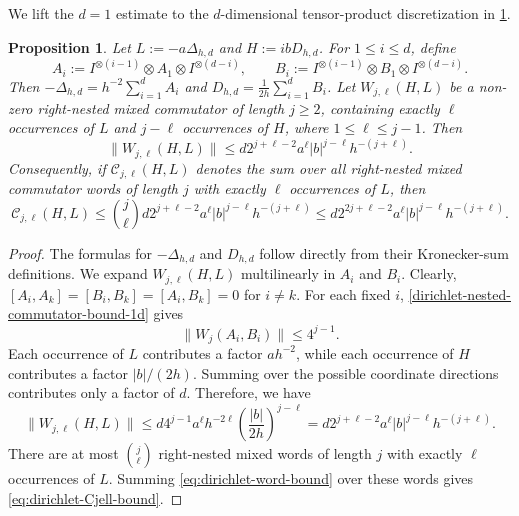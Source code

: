 \documentclass[10pt,reqno]{article}
\numberwithin{equation}{section}
\theoremstyle{plain}
\newtheorem{prop}[thm]{Proposition}
\theoremstyle{definition}
\begin{document}
We lift the $d=1$ estimate to the \(d\)-dimensional tensor-product discretization in \cref{prop:dirichlet-nested-commutator-bound-d}.
 

\begin{prop}\label{prop:dirichlet-nested-commutator-bound-d}
Let \(L:=-a\Delta_{h,d}\) and \(H:=ibD_{h,d}\). For \(1\leq i\leq d\), define
\begin{equation}\label{eq:dirichlet-coordinate-operators}
A_i := I^{\otimes(i-1)} \otimes A_1 \otimes I^{\otimes(d-i)}, \qquad B_i := I^{\otimes(i-1)} \otimes B_1 \otimes I^{\otimes(d-i)}.
\end{equation}
Then $-\Delta_{h,d} = h^{-2}\sum_{i=1}^d A_i$ and $D_{h,d}  = \frac{1}{2h}\sum_{i=1}^d B_i$. Let \(W_{j,\ell}(H,L)\) be a non-zero right-nested mixed commutator of length \(j\geq2\), containing exactly \(\ell\) occurrences of \(L\) and \(j-\ell\) occurrences of \(H\), where \(1\leq \ell\leq j-1\). Then
\begin{equation}\label{eq:dirichlet-word-bound}
\|W_{j,\ell}(H,L)\| \leq d 2^{j+\ell-2} a^\ell |b|^{j-\ell} h^{-(j+\ell)}.
\end{equation}
Consequently, if \(\mathcal C_{j,\ell}(H,L)\) denotes the sum over all right-nested mixed commutator words of length \(j\) with exactly \(\ell\) occurrences of \(L\), then
\begin{equation}\label{eq:dirichlet-Cjell-bound}
\mathcal C_{j,\ell}(H,L) \leq \binom{j}{\ell} d 2^{j+\ell-2} a^\ell |b|^{j-\ell} h^{-(j+\ell)} \leq d 2^{2j+\ell-2} a^\ell |b|^{j-\ell}  h^{-(j+\ell)}.
\end{equation}
\end{prop}

\begin{proof}
The formulas for \(-\Delta_{h,d}\) and \(D_{h,d}\) follow directly from their Kronecker-sum definitions. We expand \(W_{j,\ell}(H,L)\) multilinearly in \(A_i\) and \(B_i\). Clearly, $[A_i,A_k]=[B_i,B_k]=[A_i,B_k]=0$ for $i\neq k$. For each fixed \(i\), \cref{dirichlet-nested-commutator-bound-1d} gives
\begin{equation}\label{eq:coordinate-wise-dimensionless-bound}
\|W_j(A_i,B_i)\| \leq 4^{j-1}.
\end{equation}
Each occurrence of \(L\) contributes a factor \(ah^{-2}\), while each occurrence of \(H\) contributes a factor \(|b|/(2h)\). Summing over the possible coordinate directions contributes only a factor of \(d\). Therefore, we have
\begin{equation}\label{eq:dirichlet-word-bound-proof-first}
\|W_{j,\ell}(H,L)\| \leq d  4^{j-1} a^\ell h^{-2\ell} \left(\frac{|b|}{2h}\right)^{j-\ell} = d  2^{j+\ell-2} a^\ell |b|^{j-\ell} h^{-(j+\ell)}. 
\end{equation}
There are at most \(\binom{j}{\ell}\) right-nested mixed words of length \(j\) with exactly \(\ell\) occurrences of \(L\). Summing \cref{eq:dirichlet-word-bound} over these words gives \cref{eq:dirichlet-Cjell-bound}.
\end{proof}
\end{document}

